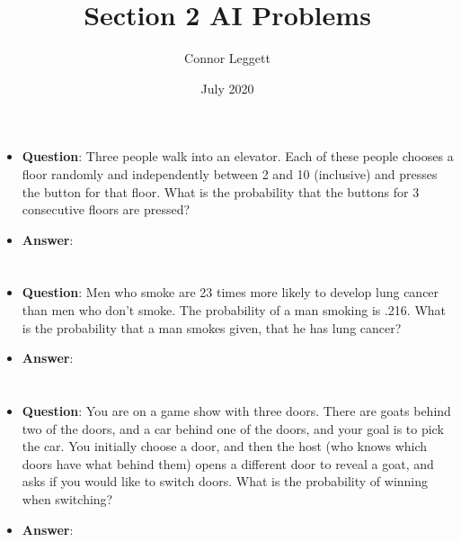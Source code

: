 \documentclass{article}
\title{Section 2 AI Problems}
\author{Connor Leggett}
\date{July 2020}
\begin{document}
\maketitle

\section{}

\begin{itemize}
    \item \textbf{Question}: Three people walk into an elevator. Each of these people chooses a floor randomly and independently between 2 and 10 (inclusive) and presses the button for that floor. What is the probability that the buttons for 3 consecutive floors are pressed?
    \item \textbf{Answer}: 
\end{itemize}




\section{}

\begin{itemize}
    \item \textbf{Question}: Men who smoke are 23 times more likely to develop lung cancer than men who don’t smoke. The probability of a man smoking is .216. What is the probability that a man smokes given, that he has lung cancer?

    \item \textbf{Answer}: 
\end{itemize}

\section{}

\begin{itemize}
    \item \textbf{Question}: You are on a game show with three doors. There are goats behind two of the doors, and a car behind one of the doors, and your goal is to pick the car. You initially choose a door, and then the host (who knows which doors have what behind them) opens a different door to reveal a goat, and asks if you would like to switch doors. What is the probability of winning when switching?
    \item \textbf{Answer}:
    
\end{itemize}
\end{document}
